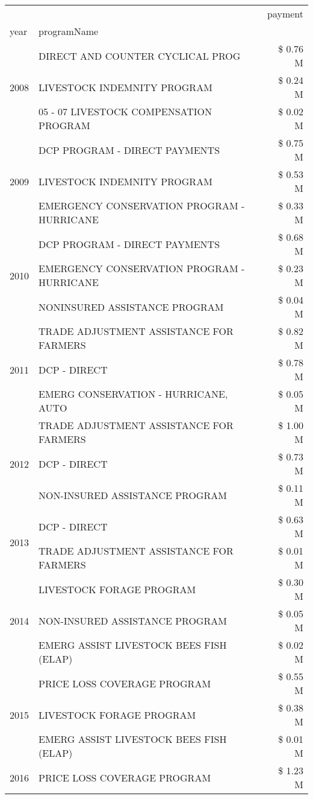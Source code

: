 \begin{tabular}{llr}
\toprule
 &  & payment \\
year & programName &  \\
\midrule
\multirow[t]{3}{*}{2008} & DIRECT AND COUNTER CYCLICAL PROG & \$ 0.76 M \\
 & LIVESTOCK INDEMNITY PROGRAM & \$ 0.24 M \\
 & 05 - 07 LIVESTOCK COMPENSATION PROGRAM & \$ 0.02 M \\
\cline{1-3}
\multirow[t]{3}{*}{2009} & DCP PROGRAM - DIRECT PAYMENTS & \$ 0.75 M \\
 & LIVESTOCK INDEMNITY PROGRAM & \$ 0.53 M \\
 & EMERGENCY CONSERVATION PROGRAM - HURRICANE & \$ 0.33 M \\
\cline{1-3}
\multirow[t]{3}{*}{2010} & DCP PROGRAM - DIRECT PAYMENTS & \$ 0.68 M \\
 & EMERGENCY CONSERVATION PROGRAM - HURRICANE & \$ 0.23 M \\
 & NONINSURED ASSISTANCE PROGRAM & \$ 0.04 M \\
\cline{1-3}
\multirow[t]{3}{*}{2011} & TRADE ADJUSTMENT ASSISTANCE FOR FARMERS & \$ 0.82 M \\
 & DCP - DIRECT & \$ 0.78 M \\
 & EMERG CONSERVATION - HURRICANE, AUTO & \$ 0.05 M \\
\cline{1-3}
\multirow[t]{3}{*}{2012} & TRADE ADJUSTMENT ASSISTANCE FOR FARMERS & \$ 1.00 M \\
 & DCP - DIRECT & \$ 0.73 M \\
 & NON-INSURED ASSISTANCE PROGRAM & \$ 0.11 M \\
\cline{1-3}
\multirow[t]{2}{*}{2013} & DCP - DIRECT & \$ 0.63 M \\
 & TRADE ADJUSTMENT ASSISTANCE FOR FARMERS & \$ 0.01 M \\
\cline{1-3}
\multirow[t]{3}{*}{2014} & LIVESTOCK FORAGE PROGRAM & \$ 0.30 M \\
 & NON-INSURED ASSISTANCE PROGRAM & \$ 0.05 M \\
 & EMERG ASSIST LIVESTOCK BEES FISH (ELAP) & \$ 0.02 M \\
\cline{1-3}
\multirow[t]{3}{*}{2015} & PRICE LOSS COVERAGE PROGRAM & \$ 0.55 M \\
 & LIVESTOCK FORAGE PROGRAM & \$ 0.38 M \\
 & EMERG ASSIST LIVESTOCK BEES FISH (ELAP) & \$ 0.01 M \\
\cline{1-3}
\multirow[t]{3}{*}{2016} & PRICE LOSS COVERAGE PROGRAM & \$ 1.23 M \\

\end{tabular}
